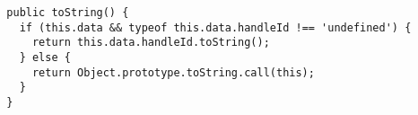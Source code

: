 \begin{verbatim}
  public toString() {
    if (this.data && typeof this.data.handleId !== 'undefined') {
      return this.data.handleId.toString();
    } else {
      return Object.prototype.toString.call(this);
    }
  }
\end{verbatim}
